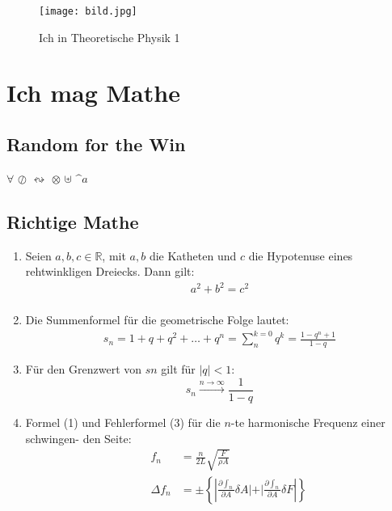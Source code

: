 \documentclass[]{scrartcl}
\begin{document}
\begin{figure}
\begin{center}
  \texttt{[image: bild.jpg]}
  \caption{Ich in Theoretische Physik 1}
  \label{fig:Bild1}
\end{center}
\end{figure}  


 
\section{Ich mag Mathe}
\subsection{Random for the Win}
$\forall$ $\oslash$ $\leftrightsquigarrow$ $\otimes$ $\uplus$ $\^{a}$

\subsection{Richtige Mathe}
\begin{enumerate}[label=(\Roman*)]
		\item Seien $a, b, c \in \mathds{R}$, mit $a, b$ die Katheten und $c$ die Hypotenuse eines rehtwinkligen Dreiecks. Dann gilt:
		\begin{align}
		a^2+b^2=c^2 \\
		\end{align}

        \item Die Summenformel für die geometrische Folge lautet:
        \begin{align}
		s_n = 1 + q + q^2 + \ldots +q^n =
		\sum_{n}^{k=0}q^k =
		\frac{1 - q^n+1}{1-q}
		\end{align}
		
		\item Für den Grenzwert von $s n$ gilt für $|q| < 1$:
		\[s_n \xrightarrow{ n \rightarrow \infty} \frac{1}{1 -q} \]
		
		\item Formel (1) und Fehlerformel (3) für die $n$-te harmonische Frequenz einer schwingen-
den Seite:
		\begin{align}
		&& f_n &= \frac{n}{2L} \sqrt{\frac{F}{\rho A}} \\
		&&  \Delta f_n  &= \pm \left \{ {\left|\frac{\partial \int_n}{\partial A}\delta A|+|\frac{\partial \int_n}{\partial A}\delta F\right|} \right \}  
		\end{align}
		
		\end{enumerate}
\end{document}
